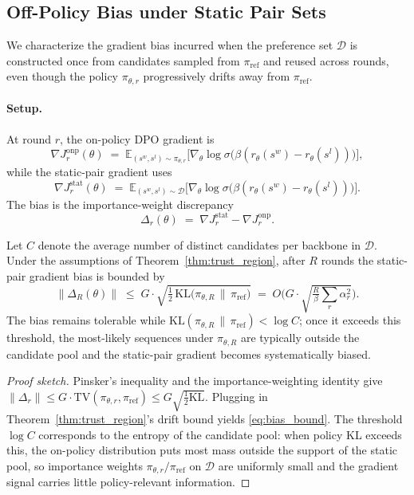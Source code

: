 {{%
\subsection{Off-Policy Bias under Static Pair Sets}
\label{app:off_policy}

We characterize the gradient bias incurred when the preference set $\mathcal{D}$ is constructed once from candidates sampled from $\pi_{\mathrm{ref}}$ and reused across rounds, even though the policy $\pi_{\theta, r}$ progressively drifts away from $\pi_{\mathrm{ref}}$.

\paragraph{Setup.}
At round $r$, the on-policy DPO gradient is
\[
\nabla J_r^{\mathrm{onp}}(\theta) \;=\; \mathbb{E}_{(s^w,s^l)\sim \pi_{\theta,r}}\Big[\nabla_\theta \log \sigma\big(\beta(r_\theta(s^w) - r_\theta(s^l))\big)\Big],
\]
while the static-pair gradient uses
\[
\nabla J_r^{\mathrm{stat}}(\theta) \;=\; \mathbb{E}_{(s^w,s^l)\sim \mathcal{D}}\Big[\nabla_\theta \log \sigma\big(\beta(r_\theta(s^w) - r_\theta(s^l))\big)\Big].
\]
The bias is the importance-weight discrepancy
\[
\Delta_r(\theta) \;=\; \nabla J_r^{\mathrm{stat}} - \nabla J_r^{\mathrm{onp}}.
\]

\begin{theorem}
\label{thm:off_policy}
Let $C$ denote the average number of distinct candidates per backbone in $\mathcal{D}$. Under the assumptions of Theorem~\ref{thm:trust_region}, after $R$ rounds the static-pair gradient bias is bounded by
\begin{equation}
\big\|\Delta_R(\theta)\big\| \;\leq\; G \cdot \sqrt{\tfrac{1}{2}\,\mathrm{KL}\big(\pi_{\theta, R} \,\|\, \pi_{\mathrm{ref}}\big)}
\;=\; O\!\Big(G \cdot \sqrt{\tfrac{R}{\beta}\sum_r \alpha_r^2}\Big).
\label{eq:bias_bound}
\end{equation}
The bias remains tolerable while $\mathrm{KL}(\pi_{\theta, R} \,\|\, \pi_{\mathrm{ref}}) < \log C$; once it exceeds this threshold, the most-likely sequences under $\pi_{\theta, R}$ are typically outside the candidate pool and the static-pair gradient becomes systematically biased.
\end{theorem}

\begin{proof}[Proof sketch]
Pinsker's inequality and the importance-weighting identity give $\|\Delta_r\| \leq G \cdot \mathrm{TV}(\pi_{\theta,r}, \pi_{\mathrm{ref}}) \leq G \sqrt{\tfrac{1}{2}\mathrm{KL}}$. Plugging in Theorem~\ref{thm:trust_region}'s drift bound yields \eqref{eq:bias_bound}. The threshold $\log C$ corresponds to the entropy of the candidate pool: when policy KL exceeds this, the on-policy distribution puts most mass outside the support of the static pool, so importance weights $\pi_{\theta,r}/\pi_{\mathrm{ref}}$ on $\mathcal{D}$ are uniformly small and the gradient signal carries little policy-relevant information.
\end{proof}

}}

